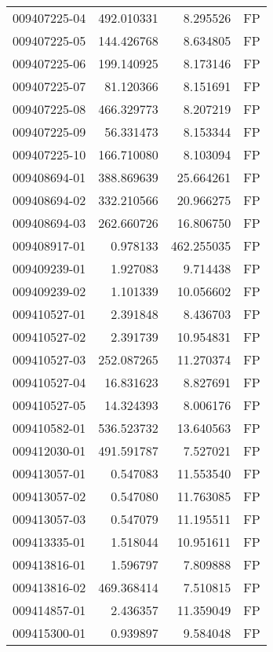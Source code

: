 \begin{tabular}{lrrl}
009407225-04 &  492.010331 &       8.295526 &   FP \\
009407225-05 &  144.426768 &       8.634805 &   FP \\
009407225-06 &  199.140925 &       8.173146 &   FP \\
009407225-07 &   81.120366 &       8.151691 &   FP \\
009407225-08 &  466.329773 &       8.207219 &   FP \\
009407225-09 &   56.331473 &       8.153344 &   FP \\
009407225-10 &  166.710080 &       8.103094 &   FP \\
009408694-01 &  388.869639 &      25.664261 &   FP \\
009408694-02 &  332.210566 &      20.966275 &   FP \\
009408694-03 &  262.660726 &      16.806750 &   FP \\
009408917-01 &    0.978133 &     462.255035 &   FP \\
009409239-01 &    1.927083 &       9.714438 &   FP \\
009409239-02 &    1.101339 &      10.056602 &   FP \\
009410527-01 &    2.391848 &       8.436703 &   FP \\
009410527-02 &    2.391739 &      10.954831 &   FP \\
009410527-03 &  252.087265 &      11.270374 &   FP \\
009410527-04 &   16.831623 &       8.827691 &   FP \\
009410527-05 &   14.324393 &       8.006176 &   FP \\
009410582-01 &  536.523732 &      13.640563 &   FP \\
009412030-01 &  491.591787 &       7.527021 &   FP \\
009413057-01 &    0.547083 &      11.553540 &   FP \\
009413057-02 &    0.547080 &      11.763085 &   FP \\
009413057-03 &    0.547079 &      11.195511 &   FP \\
009413335-01 &    1.518044 &      10.951611 &   FP \\
009413816-01 &    1.596797 &       7.809888 &   FP \\
009413816-02 &  469.368414 &       7.510815 &   FP \\
009414857-01 &    2.436357 &      11.359049 &   FP \\
009415300-01 &    0.939897 &       9.584048 &   FP \\

\end{tabular}
